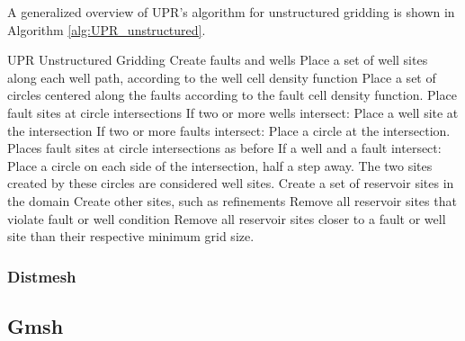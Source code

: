 
A generalized overview of UPR's algorithm for unstructured gridding \cite[pp. 51]{UPR_thesis} is shown in Algorithm \ref{alg:UPR_unstructured}.
\begin{pseudocode}[label=alg:UPR_unstructured]{UPR Unstructured Gridding}
Create faults and wells
    Place a set of well sites along each well path, according to the well cell density function
    Place a set of circles centered along the faults according to the fault cell density function. Place fault sites at circle intersections
    If two or more wells intersect:
        Place a well site at the intersection
    If two or more faults intersect:
        Place a circle at the intersection. Places fault sites at circle intersections as before
    If a well and a fault intersect:
        Place a circle on each side of the intersection, half a step away. The two sites created by these circles are considered well sites.
Create a set of reservoir sites in the domain
Create other sites, such as refinements
Remove all reservoir sites that violate fault or well condition
Remove all reservoir sites closer to a fault or well site than their respective minimum grid size.
\end{pseudocode}

\subsubsection{Distmesh}

\subsection{Gmsh}
\label{sec:Gmsh}